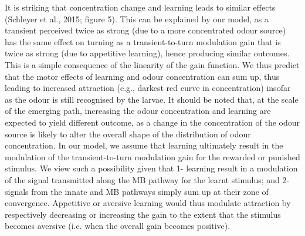 \documentclass[10pt,a4paper]{article}
\begin{document}
It is striking that concentration change and learning leads to similar effects (Schleyer et al., 2015; figure 5). This can be explained by our model, as a transient perceived twice as strong (due to a more concentrated odour source) has the same effect on turning as a transient-to-turn modulation gain that is twice as strong (due to appetitive learning), hence producing similar outcomes. This is a simple consequence of the linearity of the gain function. We thus predict that the motor effects of learning and odour concentration can sum up, thus leading to increased attraction (e.g., darkest red curve in concentration) insofar as the odour is still recognised by the larvae.
 It should be noted that, at the scale of the emerging path, increasing the odour concentration and learning are expected to yield different outcome, as a change in the concentration of the odour source is likely to alter the overall shape of the distribution of odour concentration.
In our model, we assume that learning ultimately result in the modulation of the transient-to-turn modulation gain for the rewarded or punished stimulus. We view such a possibility given that 1- learning result in a modulation of the signal transmitted along the MB pathway for the learnt stimulus; and 2- signals from the innate and MB pathways simply sum up at their zone of convergence. Appetitive or aversive learning would thus modulate attraction by respectively decreasing or increasing the gain to the extent that the stimulus becomes aversive (i.e. when the overall gain becomes positive).
\end{document}
